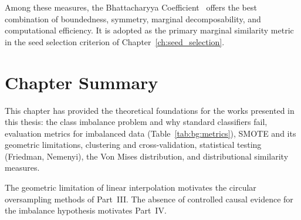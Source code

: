 \noindent Among these measures, the Bhattacharyya Coefficient~\cite{bhattacharyya1943measure} offers the best combination of boundedness, symmetry, marginal decomposability, and computational efficiency.
It is adopted as the primary marginal similarity metric in the seed selection criterion of Chapter~\ref{ch:seed_selection}.

\section{Chapter Summary}
\label{sec:bg:summary}

This chapter has provided the theoretical foundations for the works presented in this thesis: the class imbalance problem and why standard classifiers fail, evaluation metrics for imbalanced data (Table~\ref{tab:bg:metrics}), SMOTE and its geometric limitations, clustering and cross-validation, statistical testing (Friedman, Nemenyi), the Von Mises distribution, and distributional similarity measures.

The geometric limitation of linear interpolation motivates the circular oversampling methods of Part~III.
The absence of controlled causal evidence for the imbalance hypothesis motivates Part~IV.
